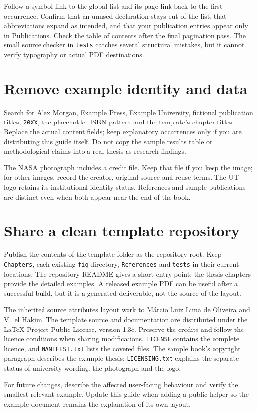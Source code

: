 Follow a symbol link to the global list and its page link back to the first
occurrence. Confirm that an unused declaration stays out of the list, that
abbreviations expand as intended, and that your publication entries appear only
in Publications. Check the table of contents after the final pagination pass.
The small source checker in \texttt{tests} catches several structural mistakes,
but it cannot verify typography or actual PDF destinations.

\section{Remove example identity and data}
Search for Alex Morgan, Example Press, Example University, fictional publication
titles, \texttt{20XX}, the placeholder ISBN pattern and the template's chapter
titles. Replace the actual content fields; keep explanatory occurrences only
if you are distributing this guide itself. Do not copy the sample results table
or methodological claims into a real thesis as research findings.

The NASA photograph includes a credit file. Keep that file if you keep the
image; for other images, record the creator, original source and reuse terms.
The UT logo retains its institutional identity status. References and sample
publications are distinct even when both appear near the end of the book.

\section{Share a clean template repository}
Publish the contents of the template folder as the repository root. Keep
\texttt{Chapters}, each existing \texttt{fig} directory, \texttt{References} and
\texttt{tests} in their current locations. The repository README gives a short
entry point; the thesis chapters provide the detailed examples. A released
example PDF can be useful after a successful build, but it is a generated
deliverable, not the source of the layout.

The inherited source attributes layout work to M\'arcio Luiz Lima de Oliveira
and V.\ el Hakim. The template source and documentation are distributed under
the LaTeX Project Public License, version 1.3c. Preserve the credits and follow
the licence conditions when sharing modifications. \texttt{LICENSE} contains
the complete licence, and \texttt{MANIFEST.txt} lists the covered files. The
sample book's copyright paragraph describes the example thesis;
\texttt{LICENSING.txt} explains the separate status of university wording,
the photograph and the logo.

For future changes, describe the affected user-facing behaviour and verify the
smallest relevant example. Update this guide when adding a public helper so
the example document remains the explanation of its own layout.
